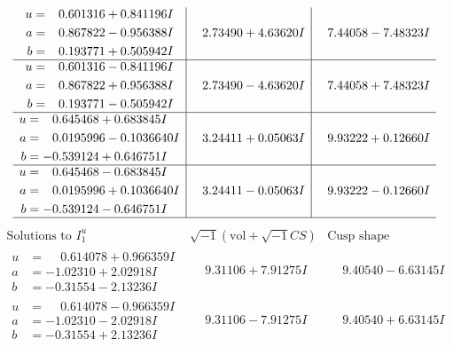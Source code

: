 \documentclass[1p]{elsarticle_modified}
\theoremstyle{definition}
\newcommand{\I}{\sqrt{-1}}
\begin{document}
$$\begin{array}{c|c|c}
\begin{aligned}
u &= \phantom{-}0.601316 + 0.841196 I \\
a &= \phantom{-}0.867822 - 0.956388 I \\
b &= \phantom{-}0.193771 + 0.505942 I\end{aligned}
 & \phantom{-}2.73490 + 4.63620 I & \phantom{-}7.44058 - 7.48323 I \\ \hline\begin{aligned}
u &= \phantom{-}0.601316 - 0.841196 I \\
a &= \phantom{-}0.867822 + 0.956388 I \\
b &= \phantom{-}0.193771 - 0.505942 I\end{aligned}
 & \phantom{-}2.73490 - 4.63620 I & \phantom{-}7.44058 + 7.48323 I \\ \hline\begin{aligned}
u &= \phantom{-}0.645468 + 0.683845 I \\
a &= \phantom{-}0.0195996 - 0.1036640 I \\
b &= -0.539124 + 0.646751 I\end{aligned}
 & \phantom{-}3.24411 + 0.05063 I & \phantom{-}9.93222 + 0.12660 I \\ \hline\begin{aligned}
u &= \phantom{-}0.645468 - 0.683845 I \\
a &= \phantom{-}0.0195996 + 0.1036640 I \\
b &= -0.539124 - 0.646751 I\end{aligned}
 & \phantom{-}3.24411 - 0.05063 I & \phantom{-}9.93222 - 0.12660 I\\
 \hline 
 \end{array}$$\newpage$$\begin{array}{c|c|c}  
\text{Solutions to }I^u_{1}& \I (\text{vol} + \sqrt{-1}CS) & \text{Cusp shape}\\
 \hline 
\begin{aligned}
u &= \phantom{-}0.614078 + 0.966359 I \\
a &= -1.02310 + 2.02918 I \\
b &= -0.31554 - 2.13236 I\end{aligned}
 & \phantom{-}9.31106 + 7.91275 I & \phantom{-}9.40540 - 6.63145 I \\ \hline\begin{aligned}
u &= \phantom{-}0.614078 - 0.966359 I \\
a &= -1.02310 - 2.02918 I \\
b &= -0.31554 + 2.13236 I\end{aligned}
 & \phantom{-}9.31106 - 7.91275 I & \phantom{-}9.40540 + 6.63145 I \\ \hline\begin{aligned}

\end{aligned}
\end{array}$$
\end{document}
